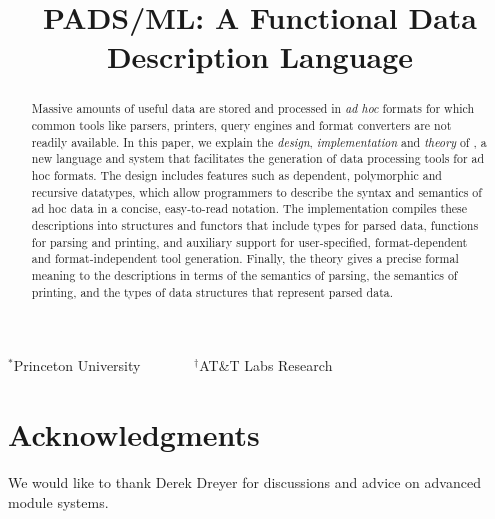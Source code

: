 \documentclass[nocopyrightspace]{sigplanconf}
\begin{document}
\title{PADS/ML: A Functional Data Description Language}
{$^\ast$Princeton University \ \ \ \ \ \ \ $^\dagger$AT\&T Labs Research}
 { \ \ \ \ }



\maketitle{}

\begin{abstract}  

  Massive amounts of useful data are stored and processed in
  \textit{ad hoc} formats for which common tools like parsers,
  printers, query engines and format converters are not readily 
  available.  In this paper,
  we explain the {\em design}, {\em implementation} and {\em theory} of \padsml{},
  a new language and system that facilitates the
  generation of data processing tools for ad hoc formats.
  The \padsml{} design includes features such as
  dependent, polymorphic and recursive datatypes, which allow
  programmers to describe
  the syntax and semantics of ad hoc data in a concise,
  easy-to-read notation.
  The \padsml{} implementation compiles these descriptions
  into \ml{} structures and functors
  that include types for parsed data, functions for parsing
  and printing, and auxiliary support
  for user-specified, format-dependent and format-independent 
  tool generation.
  Finally, the \padsml{} theory gives a precise formal meaning
  to the descriptions in terms of the semantics of parsing,
  the semantics of printing, and the types of data structures
  that represent parsed data.

\end{abstract}















\section*{Acknowledgments}

We would like to thank Derek Dreyer for discussions and advice on
advanced module systems.



%

%
\end{document}
